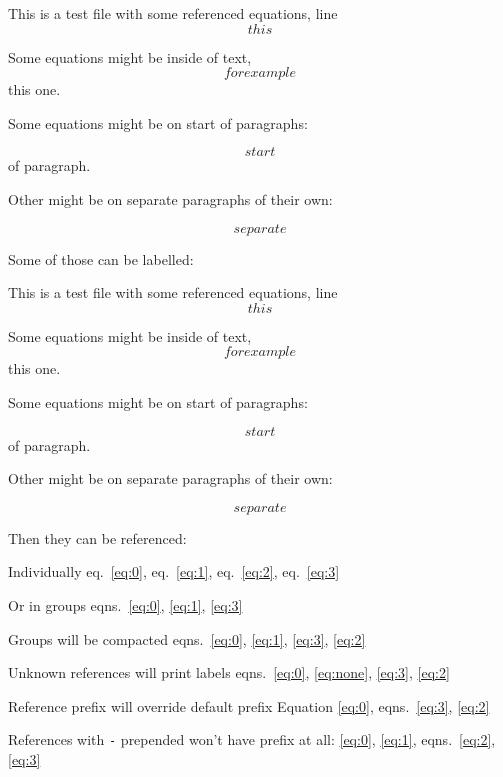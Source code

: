 This is a test file with some referenced equations, line \[ this \]

Some equations might be inside of text, \[ for example \] this one.

Some equations might be on start of paragraphs:

\[ start \] of paragraph.

Other might be on separate paragraphs of their own:

\[ separate \]

Some of those can be labelled:

This is a test file with some referenced equations, line
\begin{equation} this \label{eq:0}\end{equation}

Some equations might be inside of text,
\begin{equation} for example \label{eq:1}\end{equation} this one.

Some equations might be on start of paragraphs:

\begin{equation} start \label{eq:2}\end{equation} of paragraph.

Other might be on separate paragraphs of their own:

\begin{equation} separate \label{eq:3}\end{equation}

Then they can be referenced:

Individually eq.~\ref{eq:0}, eq.~\ref{eq:1}, eq.~\ref{eq:2},
eq.~\ref{eq:3}

Or in groups eqns.~\ref{eq:0}, \ref{eq:1}, \ref{eq:3}

Groups will be compacted
eqns.~\ref{eq:0}, \ref{eq:1}, \ref{eq:3}, \ref{eq:2}

Unknown references will print labels
eqns.~\ref{eq:0}, \ref{eq:none}, \ref{eq:3}, \ref{eq:2}

Reference prefix will override default prefix Equation \ref{eq:0},
eqns.~\ref{eq:3}, \ref{eq:2}

References with \texttt{-} prepended won't have prefix at all:
\ref{eq:0}, \ref{eq:1}, eqns.~\ref{eq:2}, \ref{eq:3}

